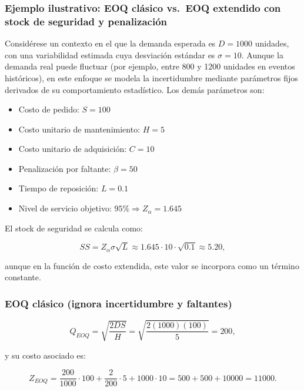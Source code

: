 \documentclass[
  spanish,
  us-letterpaper,
]{scrreprt}
\providecommand{\tightlist}{%
  \setlength{\itemsep}{0pt}\setlength{\parskip}{0pt}}
\numberwithin{equation}{section}
\begin{document}
\subsubsection{Ejemplo ilustrativo: EOQ clásico vs.~EOQ extendido con
stock de seguridad y
penalización}\label{ejemplo-ilustrativo-eoq-cluxe1sico-vs.-eoq-extendido-con-stock-de-seguridad-y-penalizaciuxf3n}

Considérese un contexto en el que la demanda esperada es \(D=1000\)
unidades, con una variabilidad estimada cuya desviación estándar es
\(\sigma=10\). Aunque la demanda real puede fluctuar (por ejemplo, entre
800 y 1200 unidades en eventos históricos), en este enfoque se modela la
incertidumbre mediante parámetros fijos derivados de su comportamiento
estadístico. Los demás parámetros son:

\begin{itemize}
\tightlist
\item
  Costo de pedido: \(S=100\)\\
\item
  Costo unitario de mantenimiento: \(H=5\)\\
\item
  Costo unitario de adquisición: \(C=10\)\\
\item
  Penalización por faltante: \(\beta=50\)\\
\item
  Tiempo de reposición: \(L=0.1\)\\
\item
  Nivel de servicio objetivo: \(95\%\Rightarrow Z_{\alpha}=1.645\)
\end{itemize}

El stock de seguridad se calcula como:

\[
SS=Z_{\alpha}\sigma\sqrt{L}\approx1.645\cdot10\cdot\sqrt{0.1}\approx5.20,
\]

aunque en la función de costo extendida, este valor se incorpora como un
término constante.

\subsubsection{EOQ clásico (ignora incertidumbre y
faltantes)}\label{eoq-cluxe1sico-ignora-incertidumbre-y-faltantes}

\[
Q_{EOQ}=\sqrt{\frac{2DS}{H}}=\sqrt{\frac{2(1000)(100)}{5}}=200,
\]

y su costo asociado es:

\[
Z_{EOQ}=\frac{200}{1000}\cdot100+\frac{2}{200}\cdot5+1000\cdot10
=500+500+10000=11000.
\]
\end{document}
